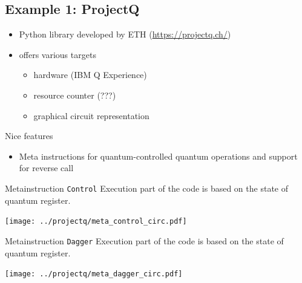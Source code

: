 \documentclass{beamer}
\begin{document}
\subsection{Example 1: ProjectQ}

\begin{frame}{\insertsection}{\insertsubsection}
	\begin{itemize}
        \item Python library developed by ETH (\url{https://projectq.ch/})
        \item offers various targets
        \begin{itemize}
            \item hardware (IBM Q Experience)
            \item resource counter (???)
            \item graphical circuit representation
        \end{itemize}
    \end{itemize}
\end{frame}

\begin{frame}{\insertsection}{\insertsubsection}
    Nice features
    \begin{itemize}
        \item Meta instructions for quantum-controlled quantum operations and 
        support for reverse call
    \end{itemize}
\end{frame}

\begin{frame}{\insertsection}{\insertsubsection}
    \begin{block}{Metainstruction \texttt{Control}}
        Execution part of the code is based on the state of quantum register.
    \end{block}

    \begin{center}
     \texttt{[image: ../projectq/meta\_control\_circ.pdf]}
    \end{center}
\end{frame}

\begin{frame}{\insertsection}{\insertsubsection}
    \begin{block}{Metainstruction \texttt{Dagger}}
        Execution part of the code is based on the state of quantum register.
    \end{block}
    
    \begin{center}
        \texttt{[image: ../projectq/meta\_dagger\_circ.pdf]}
    \end{center}
\end{frame}
\end{document}
